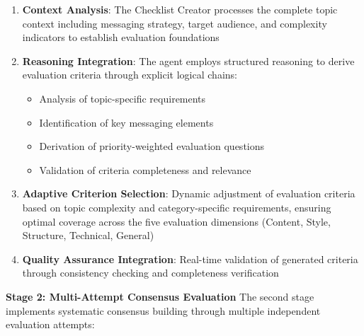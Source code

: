 \begin{enumerate}
    \item \textbf{Context Analysis}: The Checklist Creator processes the complete topic context including messaging strategy, target audience, and complexity indicators to establish evaluation foundations
    
    \item \textbf{Reasoning Integration}: The agent employs structured reasoning to derive evaluation criteria through explicit logical chains:
    \begin{itemize}
        \item Analysis of topic-specific requirements
        \item Identification of key messaging elements
        \item Derivation of priority-weighted evaluation questions
        \item Validation of criteria completeness and relevance
    \end{itemize}
    
    \item \textbf{Adaptive Criterion Selection}: Dynamic adjustment of evaluation criteria based on topic complexity and category-specific requirements, ensuring optimal coverage across the five evaluation dimensions (Content, Style, Structure, Technical, General)
    
    \item \textbf{Quality Assurance Integration}: Real-time validation of generated criteria through consistency checking and completeness verification
\end{enumerate}

\textbf{Stage 2: Multi-Attempt Consensus Evaluation}
The second stage implements systematic consensus building through multiple independent evaluation attempts:

